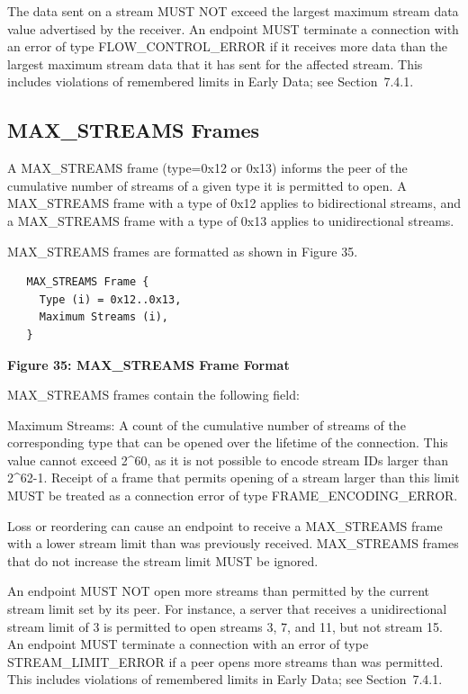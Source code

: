 \documentclass{article}
\begin{document}
The data sent on a stream MUST NOT exceed the largest maximum stream data value advertised by the receiver.  An endpoint MUST terminate a connection with an error of type FLOW\_CONTROL\_ERROR if it receives more data than the largest maximum stream data that it has sent for the affected stream.  This includes violations of remembered limits in Early Data; see Section~7.4.1.

\subsection{MAX\_STREAMS Frames}

A MAX\_STREAMS frame (type=0x12 or 0x13) informs the peer of the cumulative number of streams of a given type it is permitted to open. A MAX\_STREAMS frame with a type of 0x12 applies to bidirectional streams, and a MAX\_STREAMS frame with a type of 0x13 applies to unidirectional streams.

MAX\_STREAMS frames are formatted as shown in Figure 35.

\begin{verbatim}
   MAX_STREAMS Frame {
     Type (i) = 0x12..0x13,
     Maximum Streams (i),
   }
\end{verbatim}

\begin{center}
\textbf{Figure 35: MAX\_STREAMS Frame Format}
\end{center}

MAX\_STREAMS frames contain the following field:

Maximum Streams:  A count of the cumulative number of streams of the corresponding type that can be opened over the lifetime of the connection.  This value cannot exceed 2\textasciicircum{}60, as it is not possible to encode stream IDs larger than 2\textasciicircum{}62-1.  Receipt of a frame that permits opening of a stream larger than this limit MUST be treated as a connection error of type FRAME\_ENCODING\_ERROR.

Loss or reordering can cause an endpoint to receive a MAX\_STREAMS frame with a lower stream limit than was previously received. MAX\_STREAMS frames that do not increase the stream limit MUST be ignored.

An endpoint MUST NOT open more streams than permitted by the current stream limit set by its peer.  For instance, a server that receives a unidirectional stream limit of 3 is permitted to open streams 3, 7, and 11, but not stream 15.  An endpoint MUST terminate a connection with an error of type STREAM\_LIMIT\_ERROR if a peer opens more streams than was permitted.  This includes violations of remembered limits in Early Data; see Section~7.4.1.
\end{document}
